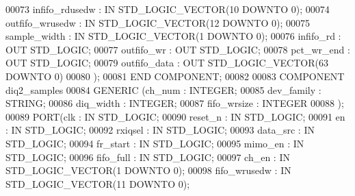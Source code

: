 \begin{DoxyCode}
00073          infifo_rdusedw : \textcolor{keywordflow}{IN} \textcolor{comment}{STD\_LOGIC\_VECTOR}(\textcolor{vhdllogic}{}\textcolor{vhdllogic}{10} \textcolor{keywordflow}{DOWNTO} \textcolor{vhdllogic}{}\textcolor{vhdllogic}{0});
00074          outfifo_wrusedw : \textcolor{keywordflow}{IN} \textcolor{comment}{STD\_LOGIC\_VECTOR}(\textcolor{vhdllogic}{}\textcolor{vhdllogic}{12} \textcolor{keywordflow}{DOWNTO} \textcolor{vhdllogic}{}\textcolor{vhdllogic}{0});
00075          sample_width : \textcolor{keywordflow}{IN} \textcolor{comment}{STD\_LOGIC\_VECTOR}(\textcolor{vhdllogic}{}\textcolor{vhdllogic}{1} \textcolor{keywordflow}{DOWNTO} \textcolor{vhdllogic}{}\textcolor{vhdllogic}{0});
00076          infifo_rd : \textcolor{keywordflow}{OUT} \textcolor{comment}{STD\_LOGIC};
00077          outfifo_wr : \textcolor{keywordflow}{OUT} \textcolor{comment}{STD\_LOGIC};
00078          pct_wr_end : \textcolor{keywordflow}{OUT} \textcolor{comment}{STD\_LOGIC};
00079          outfifo_data : \textcolor{keywordflow}{OUT} \textcolor{comment}{STD\_LOGIC\_VECTOR}(\textcolor{vhdllogic}{}\textcolor{vhdllogic}{63} \textcolor{keywordflow}{DOWNTO} \textcolor{vhdllogic}{}\textcolor{vhdllogic}{0})
00080     );
00081 \textcolor{keywordflow}{END} \textcolor{keywordflow}{COMPONENT};
00082 
00083 \textcolor{keywordflow}{COMPONENT} diq2_samples
00084 \textcolor{keywordflow}{GENERIC} (ch_num : \textcolor{comment}{INTEGER};
00085             dev_family : \textcolor{comment}{STRING};
00086             diq_width : \textcolor{comment}{INTEGER};
00087             fifo_wrsize : \textcolor{comment}{INTEGER}
00088             );
00089     \textcolor{keywordflow}{PORT}(clk : \textcolor{keywordflow}{IN} \textcolor{comment}{STD\_LOGIC};
00090          reset_n : \textcolor{keywordflow}{IN} \textcolor{comment}{STD\_LOGIC};
00091          en : \textcolor{keywordflow}{IN} \textcolor{comment}{STD\_LOGIC};
00092          rxiqsel : \textcolor{keywordflow}{IN} \textcolor{comment}{STD\_LOGIC};
00093          data_src : \textcolor{keywordflow}{IN} \textcolor{comment}{STD\_LOGIC};
00094          fr_start : \textcolor{keywordflow}{IN} \textcolor{comment}{STD\_LOGIC};
00095          mimo_en : \textcolor{keywordflow}{IN} \textcolor{comment}{STD\_LOGIC};
00096          fifo_full : \textcolor{keywordflow}{IN} \textcolor{comment}{STD\_LOGIC};
00097          ch_en : \textcolor{keywordflow}{IN} \textcolor{comment}{STD\_LOGIC\_VECTOR}(\textcolor{vhdllogic}{}\textcolor{vhdllogic}{1} \textcolor{keywordflow}{DOWNTO} \textcolor{vhdllogic}{}\textcolor{vhdllogic}{0});
00098          fifo_wrusedw : \textcolor{keywordflow}{IN} \textcolor{comment}{STD\_LOGIC\_VECTOR}(\textcolor{vhdllogic}{}\textcolor{vhdllogic}{11} \textcolor{keywordflow}{DOWNTO} \textcolor{vhdllogic}{}\textcolor{vhdllogic}{0});

\end{DoxyCode}
